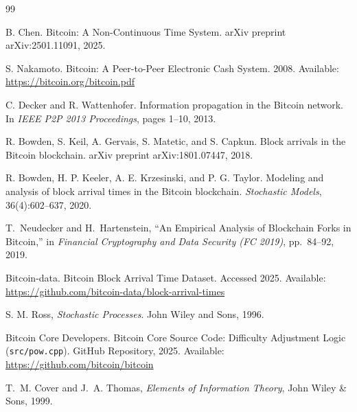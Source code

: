 \documentclass[conference]{IEEEtran}
\begin{document}



\begin{thebibliography}{99}

B. Chen.
Bitcoin: A Non-Continuous Time System.
arXiv preprint arXiv:2501.11091, 2025.

S. Nakamoto.
Bitcoin: A Peer-to-Peer Electronic Cash System.
2008.
Available: \url{https://bitcoin.org/bitcoin.pdf}

C. Decker and R. Wattenhofer.
Information propagation in the Bitcoin network.
In \textit{IEEE P2P 2013 Proceedings}, pages 1--10, 2013.

R. Bowden, S. Keil, A. Gervais, S. Matetic, and S. Capkun.
Block arrivals in the Bitcoin blockchain.
arXiv preprint arXiv:1801.07447, 2018.

R. Bowden, H. P. Keeler, A. E. Krzesinski, and P. G. Taylor.
Modeling and analysis of block arrival times in the Bitcoin blockchain.
\textit{Stochastic Models}, 36(4):602--637, 2020.

T.~Neudecker and H.~Hartenstein,
``An Empirical Analysis of Blockchain Forks in Bitcoin,''
in \emph{Financial Cryptography and Data Security (FC 2019)}, pp.~84--92, 2019.

Bitcoin-data.
Bitcoin Block Arrival Time Dataset.
Accessed 2025.
Available: \url{https://github.com/bitcoin-data/block-arrival-times}

S. M. Ross,
\textit{Stochastic Processes}.
John Wiley and Sons,
1996.

Bitcoin Core Developers.
Bitcoin Core Source Code: Difficulty Adjustment Logic (\texttt{src/pow.cpp}).
GitHub Repository, 2025.
Available: \url{https://github.com/bitcoin/bitcoin}

T.~M. Cover and J.~A. Thomas,
\emph{Elements of Information Theory},
John Wiley \& Sons, 1999.

\end{thebibliography}
\end{document}
